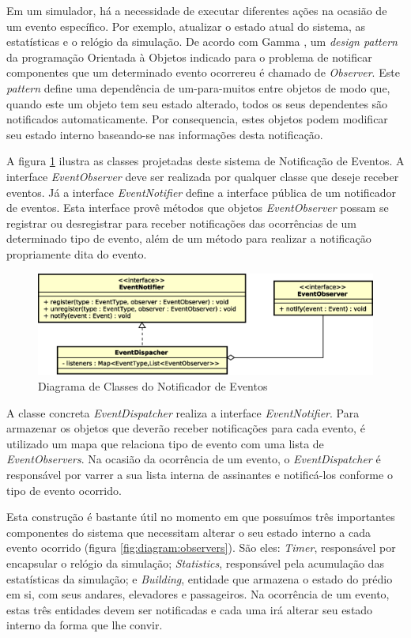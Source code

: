 Em um simulador, há a necessidade de executar diferentes ações na ocasião de um
evento específico. Por exemplo, atualizar o estado atual do sistema, as
estatísticas e o relógio da simulação. De acordo com Gamma
\cite{Gamma:1995:DPE:186897}, um \textit{design pattern} da programação
Orientada à Objetos indicado para o problema de notificar componentes que um
determinado evento ocorrereu é chamado de \textit{Observer}. Este
\textit{pattern} define uma dependência de um-para-muitos entre objetos de modo
que, quando este um objeto tem seu estado alterado, todos os seus dependentes
são notificados automaticamente. Por consequencia, estes objetos podem modificar
seu estado interno baseando-se nas informações desta notificação.

A figura \ref{fig:diagram:notification} ilustra as classes projetadas deste
sistema de Notificação de Eventos. A interface \textit{EventObserver} deve ser
realizada por qualquer classe que deseje receber eventos. Já a interface
\textit{EventNotifier} define a interface pública de um notificador de eventos.
Esta interface provê métodos que objetos \textit{EventObserver} possam se
registrar ou desregistrar para receber notificações das ocorrências de um
determinado tipo de evento, além de um método para realizar a notificação
propriamente dita do evento.

\begin{figure}[htb!]
  \centering
  \includegraphics[scale=0.6]{img/notification.eps}
  \caption{Diagrama de Classes do Notificador de Eventos}
\label{fig:diagram:notification}
\end{figure}

A classe concreta \textit{EventDispatcher} realiza a interface
\textit{EventNotifier}. Para armazenar os objetos que deverão receber
notificações para cada evento, é utilizado um mapa que relaciona tipo de evento
com uma lista de \textit{EventObservers}. Na ocasião da ocorrência de um evento,
o \textit{EventDispatcher} é responsável por varrer a sua lista interna de
assinantes e notificá-los conforme o tipo de evento ocorrido.

Esta construção é bastante útil no momento em que possuímos três importantes
componentes do sistema que necessitam alterar o seu estado interno a cada evento
ocorrido (figura \ref{fig:diagram:observers}). São eles: \textit{Timer},
responsável por encapsular o relógio da simulação; \textit{Statistics},
responsável pela acumulação das estatísticas da simulação; e \textit{Building},
entidade que armazena o estado do prédio em si, com seus andares, elevadores e
passageiros. Na ocorrência de um evento, estas três entidades devem ser
notificadas e cada uma irá alterar seu estado interno da forma que lhe convir.

